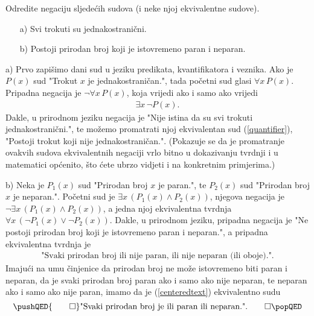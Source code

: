 \begin{exercise}
Odredite negaciju sljedećih sudova (i neke njoj ekvivalentne sudove).
\begin{itemize}
\item[a)] Svi trokuti su jednakostranični.
\item[b)] Postoji prirodan broj koji je istovremeno paran i neparan.
\end{itemize}
\end{exercise}
\begin{proof*}
a) Prvo zapišimo dani sud u jeziku predikata, kvantifikatora i veznika. Ako je $P(x)$ sud "Trokut $x$ je jednakostraničan.", tada početni sud glasi $\forall{x}\, P(x)$. Pripadna negacija je $\neg \forall{x}\, P(x)$, koja vrijedi ako i samo ako vrijedi 
\begin{align}
\label{quantifier}
\exists{x}\,\neg P(x).
\end{align}
Dakle, u prirodnom jeziku negacija je "Nije istina da su svi trokuti jednakostranični.", te možemo promatrati njoj ekvivalentan sud (\ref{quantifier}), "Postoji trokut koji nije jednakostraničan.". (Pokazuje se da je promatranje ovakvih sudova ekvivalentnih negaciji vrlo bitno u dokazivanju tvrdnji i u matematici općenito, što ćete ubrzo vidjeti i na konkretnim primjerima.)

b) Neka je $P_1(x)$ sud "Prirodan broj $x$ je paran.", te $P_2(x)$ sud "Prirodan broj $x$ je neparan.". Početni sud je $\exists{x}\, \left(P_1(x)\wedge P_2(x)\right)$, njegova negacija je $\neg\exists{x}\, \left(P_1(x)\wedge P_2(x)\right)$, a jedna njoj ekvivalentna tvrdnja $\forall{x}\, \left(\neg P_1(x)\vee \neg P_2(x)\right)$. Dakle, u prirodnom jeziku, pripadna negacija je "Ne postoji prirodan broj koji je istovremeno paran i neparan.", a pripadna ekvivalentna tvrdnja je 
\begin{align}
\label{centeredtext}
\text{"Svaki prirodan broj ili nije paran, ili nije neparan (ili oboje).".}
\end{align}
Imajući na umu činjenice da prirodan broj ne može istovremeno biti paran i neparan, da je svaki prirodan broj paran ako i samo ako nije neparan, te neparan ako i samo ako nije paran, imamo da je (\ref{centeredtext}) ekvivalentno sudu 
\[
\pushQED{\qed}
\text{"Svaki prirodan broj je ili paran ili neparan.".}\qedhere
\popQED
\]
\end{proof*}
